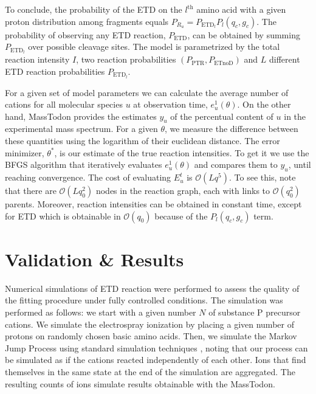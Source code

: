 \documentclass{llncs}
\begin{document}
To conclude, the probability of the ETD on the $l^\text{th}$ amino acid with a given proton distribution among fragments equals $P_{R_u}=P_{\text{ETD}_l} P_l(q_c, g_c)$.
The probability of observing any ETD reaction, $P_\text{ETD}$, can be obtained by summing $P_{\text{ETD}_l}$ over possible cleavage sites.
The model is parametrized by the total reaction intensity $I$, two reaction probabilities $(P_\text{PTR}, P_\text{ETnoD})$ and $L$ different ETD reaction probabilities $P_{\text{ETD}_l}$.

For a given set of model parameters we can calculate the average number of cations for all molecular species $u$ at observation time, $e_u^1(\theta)$. On the other hand, {\sc MassTodon} provides the estimates $y_u$ of the percentual content of $u$ in the experimental mass spectrum. For a given $\theta$, we measure the difference between these quantities using the logarithm of their euclidean distance. The error minimizer, $\theta^*$, is our estimate of the true reaction intensities.
To get it we use the BFGS algorithm that iteratively evaluates $e_u^1(\theta)$ and compares them to $y_u$, until reaching convergence.
The cost of evaluating $E_u^t$ is $\mathcal O(Lq^5)$.
To see this, note that there are $\mathcal O (Lq_0^2)$ nodes in the reaction graph, each with links to $\mathcal O(q_0^2)$ parents.
Moreover, reaction intensities can be obtained in constant time, except for ETD which is obtainable in $\mathcal O(q_0)$ because of the  $P_l(q_c, g_c)$ term.

\section{Validation \& Results}

Numerical simulations of ETD reaction were performed to assess the quality of the fitting procedure under fully controlled conditions. The simulation was performed as follows: we start with a given number $N$ of substance P precursor cations. We simulate the electrospray ionization by placing a given number of protons on randomly chosen basic amino acids. Then, we simulate the Markov Jump Process using standard simulation techniques \cite{Gillespie1977-fr}, noting that our process can be simulated as if the cations reacted independently of each other. Ions that find themselves in the same state at the end of the simulation are aggregated. The resulting counts of ions simulate results obtainable with the {\sc MassTodon}.
\end{document}
